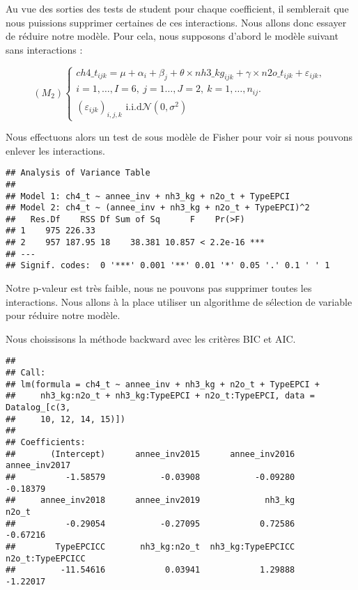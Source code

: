 \documentclass[
]{article}
\begin{document}
Au vue des sorties des tests de student pour chaque coefficient, il
semblerait que nous puissions supprimer certaines de ces interactions.
Nous allons donc essayer de réduire notre modèle. Pour cela, nous
supposons d'abord le modèle suivant sans interactions :

\[
(M_2) 
\left\{\begin{array}{l} ch4\_t_{ijk}= \mu + \alpha_i + \beta_j + \theta \times nh3\_kg_{ijk} + \gamma \times n2o\_t_{ijk} + 
\varepsilon_{ijk},\ \\
i=1,\ldots,I=6,\ j=1 \ldots,J=2, \ k=1,\ldots,n_{ij}.\\ (\varepsilon_{ijk})_{i,j,k} \textrm{ i.i.d
}\mathcal{N}(0,\sigma^2) \end{array}\right. 
\]

Nous effectuons alors un test de sous modèle de Fisher pour voir si nous
pouvons enlever les interactions.

\begin{verbatim}
## Analysis of Variance Table
## 
## Model 1: ch4_t ~ annee_inv + nh3_kg + n2o_t + TypeEPCI
## Model 2: ch4_t ~ (annee_inv + nh3_kg + n2o_t + TypeEPCI)^2
##   Res.Df    RSS Df Sum of Sq      F    Pr(>F)    
## 1    975 226.33                                  
## 2    957 187.95 18    38.381 10.857 < 2.2e-16 ***
## ---
## Signif. codes:  0 '***' 0.001 '**' 0.01 '*' 0.05 '.' 0.1 ' ' 1
\end{verbatim}

Notre p-valeur est très faible, nous ne pouvons pas supprimer toutes les
interactions. Nous allons à la place utiliser un algorithme de sélection
de variable pour réduire notre modèle.

Nous choissisons la méthode backward avec les critères BIC et AIC.

\begin{verbatim}
## 
## Call:
## lm(formula = ch4_t ~ annee_inv + nh3_kg + n2o_t + TypeEPCI + 
##     nh3_kg:n2o_t + nh3_kg:TypeEPCI + n2o_t:TypeEPCI, data = Datalog_[c(3, 
##     10, 12, 14, 15)])
## 
## Coefficients:
##       (Intercept)      annee_inv2015      annee_inv2016      annee_inv2017  
##          -1.58579           -0.03908           -0.09280           -0.18379  
##     annee_inv2018      annee_inv2019             nh3_kg              n2o_t  
##          -0.29054           -0.27095            0.72586           -0.67216  
##        TypeEPCICC       nh3_kg:n2o_t  nh3_kg:TypeEPCICC   n2o_t:TypeEPCICC  
##         -11.54616            0.03941            1.29888           -1.22017
\end{verbatim}
\end{document}
